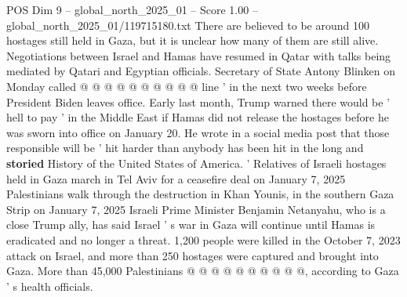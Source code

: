 \begin{textsample}{POS Dim 9 – global\_north\_2025\_01 – Score 1.00 – global\_north\_2025\_01/119715180.txt}
There are believed to be around 100 hostages still held in Gaza, but it is unclear how many of them are still alive.
Negotiations between Israel and Hamas have resumed in Qatar with talks being mediated by Qatari and Egyptian officials.
Secretary of State Antony Blinken on Monday called @ @ @ @ @ @ @ @ @ @ line ' in the next two weeks before President Biden leaves office.
Early last month, Trump warned there would be ' hell to pay ' in the Middle East if Hamas did not release the hostages before he was sworn into office on January 20.
He wrote in a social media post that those responsible will be ' hit harder than anybody has been hit in the long and \textbf{storied} History of the United States of America. ' Relatives of Israeli hostages held in Gaza march in Tel Aviv for a ceasefire deal on January 7, 2025 Palestinians walk through the destruction in Khan Younis, in the southern Gaza Strip on January 7, 2025 Israeli Prime Minister Benjamin Netanyahu, who is a close Trump ally, has said Israel ' s war in Gaza will continue until Hamas is eradicated and no longer a threat. 1,200 people were killed in the October 7, 2023 attack on Israel, and more than 250 hostages were captured and brought into Gaza.
More than 45,000 Palestinians @ @ @ @ @ @ @ @ @ @, according to Gaza ' s health officials.

\end{textsample}
